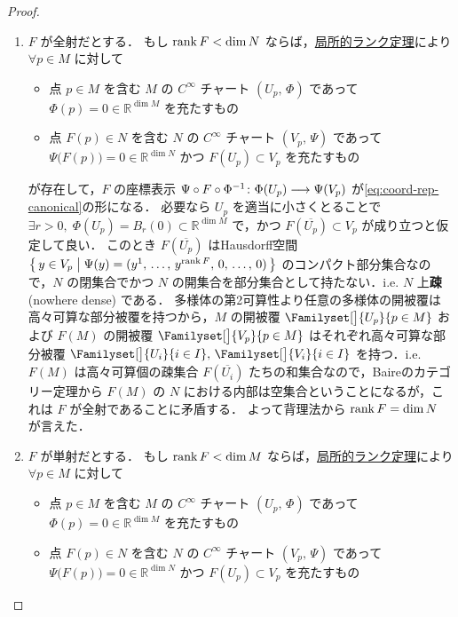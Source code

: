 \documentclass[TQFT_main]{subfiles}
\begin{document}
\begin{proof}
    \begin{enumerate}
        \item $F$ が全射だとする．
        もし $\rank F < \dim N$ ならば，\hyperref[thm:rank]{局所的ランク定理}により 
        $\forall p \in M$ に対して
        \begin{itemize}
            \item 点 $p \in M$ を含む $M$ の $C^\infty$ チャート $(U_p,\, \Phi)$ であって $\Phi(p) = 0 \in \mathbb{R}^{\dim M}$ を充たすもの
            \item 点 $F(p) \in N$ を含む $N$ の $C^\infty$ チャート $(V_p,\, \Psi)$ であって $\Psi \bigl( F(p) \bigr) = 0 \in \mathbb{R}^{\dim N}$ かつ $F(U_p) \subset V_p$ を充たすもの
        \end{itemize}
        が存在して，$F$ の座標表示 $\Psi \circ F \circ \Phi^{-1} \colon \Phi(U_p) \longrightarrow \Psi(V_p)$ が\eqref{eq:coord-rep-canonical}の形になる．
        必要なら $U_p$ を適当に小さくとることで $\exists r > 0,\; \Phi(U_p) = B_r (0) \subset \mathbb{R}^{\dim M}$ で，かつ $F(\overline{U_p}) \subset V_p$ が成り立つと仮定して良い．
        このとき $F(\overline{U_p})$ はHausdorff空間 $\bigl\{\, y \in V_p \bigm| \Psi(y) = (y^1,\, \dots,\, y^{\rank F},\, 0,\, \dots,\, 0)  \,\bigr\}$ のコンパクト部分集合なので，$N$ の閉集合でかつ $N$ の開集合を部分集合として持たない．i.e. $N$ 上\textbf{疎} (nowhere dense) である．
        多様体の第2可算性より任意の多様体の開被覆は高々可算な部分被覆を持つから，$M$ の開被覆 $\Familyset[\big]{U_p}{p \in M}$ および $F(M)$ の開被覆 $\Familyset[\big]{V_p}{p \in M}$ はそれぞれ高々可算な部分被覆 $\Familyset[\big]{U_{i}}{i \in I},\, \Familyset[\big]{V_i}{i \in I}$ を持つ．i.e. $F(M)$ は高々可算個の疎集合 $F(\overline{U_i})$ たちの和集合なので，Baireのカテゴリー定理から $F(M)$ の $N$ における内部は空集合ということになるが，これは $F$ が全射であることに矛盾する．
        よって背理法から $\rank F = \dim N$ が言えた．
        \item $F$ が単射だとする．
        もし $\rank F < \dim M$ ならば，\hyperref[thm:rank]{局所的ランク定理}により 
        $\forall p \in M$ に対して
        \begin{itemize}
            \item 点 $p \in M$ を含む $M$ の $C^\infty$ チャート $(U_p,\, \Phi)$ であって $\Phi(p) = 0 \in \mathbb{R}^{\dim M}$ を充たすもの
            \item 点 $F(p) \in N$ を含む $N$ の $C^\infty$ チャート $(V_p,\, \Psi)$ であって $\Psi \bigl( F(p) \bigr) = 0 \in \mathbb{R}^{\dim N}$ かつ $F(U_p) \subset V_p$ を充たすもの

\end{itemize}
\end{enumerate}
\end{proof}
\end{document}
